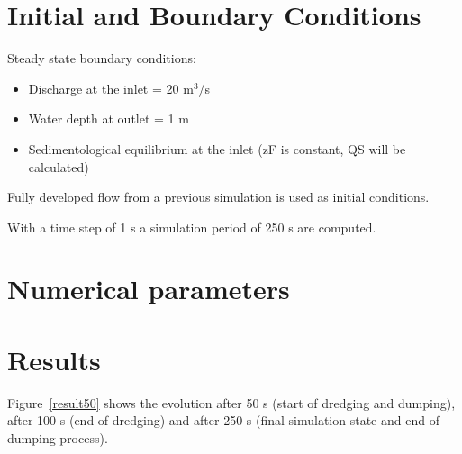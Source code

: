 %
%
\section{Initial and Boundary Conditions}
%
Steady state boundary conditions:
\begin{itemize}
\item{Discharge at the inlet = 20 m$^3$/s}
\item Water depth at outlet = 1 m
\item Sedimentological equilibrium at the inlet (zF is constant, QS will be calculated)
\end{itemize}
Fully developed flow from a previous simulation is used as initial conditions.

With a time step of 1 s a simulation period of 250 s are computed.
%
%
\section{Numerical parameters}
%
%
%
\section{Results}
%
Figure~\ref{result50} shows the evolution after 50 s (start of dredging and dumping),
after 100 s (end of dredging) and after 250 s (final simulation state and end of dumping process).

